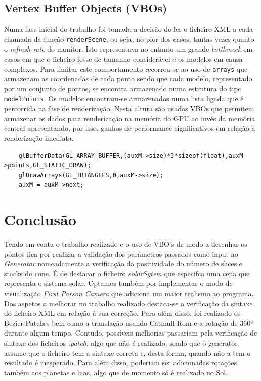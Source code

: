 \documentclass{article}
\begin{document}
\subsection{Vertex Buffer Objects (VBOs)}
Numa fase inicial do trabalho foi tomada a decisão de ler o ficheiro XML a cada chamada da função \texttt{renderScene}, ou seja, no pior dos casos, tantas vezes quanto o \textit{refresh rate} do monitor. Isto representava no entanto um grande \textit{bottleneck} em casos em que o ficheiro fosse de tamanho considerável e os modelos em causa complexos. Para limitar este comportamento recorreu-se ao uso de \texttt{arrays} que armazenam as coordenadas de cada ponto sendo que cada modelo, representado por um conjunto de pontos, se encontra armazenado numa estrutura do tipo \texttt{modelPoints}.
Os modelos encontram-se armazenados numa lista ligada que é percorrida na fase de renderização. Nesta altura são usados VBOs que permitem armazenar os dados para renderização na memória do GPU ao invés da memória central apresentando, por isso, ganhos de performance significativos em relação à renderização imediata.

\begin{Verbatim}
    glBufferData(GL_ARRAY_BUFFER,(auxM->size)*3*sizeof(float),auxM->points,GL_STATIC_DRAW);
    glDrawArrays(GL_TRIANGLES,0,auxM->size);
    auxM = auxM->next;
\end{Verbatim}

\newpage

\section{Conclusão}
Tendo em conta o trabalho realizado e o uso de VBO's de modo a desenhar os pontos fica por realizar a validação dos parâmetros passados como input ao \textit{Generator} nomeadamente a verificação da positividade do número de slices e stacks do cone. 
É de destacar o ficheiro \textit{solarSytem} que especifca uma cena que representa o sistema solar. Optamos também por implementar o modo de visualização \textit{First Person Camera} que adiciona um maior realismo ao programa. Dos aspetos a melhorar no trabalho realizado destaca-se a verificação da sintaxe do ficheiro XML em relação à sua correção. 
Para além disso, foi realizado os Bezier Patches bem como a translação usando Catmull Rom e a rotação de 360º durante algum tempo. Contudo, possíveis melhorias passariam pela verificação de sintaxe dos ficheiros \textit{.patch}, algo que não é realizado, sendo que o generator assume que o ficheiro tem a sintaxe correta e, desta forma, quando não a tem o resultado é inesperado. Para além disso, poderiam ser adicionadas rotações também aos planetas e luas, algo que de momento só é realizado no Sol.
\end{document}
